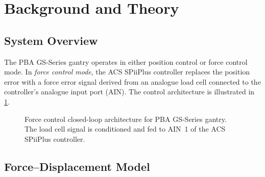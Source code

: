 
\section{Background and Theory}
\label{sec:background}


\subsection{System Overview}
\label{sec:background:system}

The PBA GS-Series gantry operates in either position control or force
control mode.  In \emph{force control mode}, the ACS SPiiPlus controller
replaces the position error with a force error signal derived from an
analogue load cell connected to the controller's analogue input port (AIN).
The control architecture is illustrated in \cref{fig:control-arch}.

\begin{figure}[H]
  \centering
  \caption{Force control closed-loop architecture for PBA GS-Series gantry.
           The load cell signal is conditioned and fed to AIN~1 of the
           ACS SPiiPlus controller.}
  \label{fig:control-arch}
\end{figure}


\subsection{Force–Displacement Model}
\label{sec:background:model}

